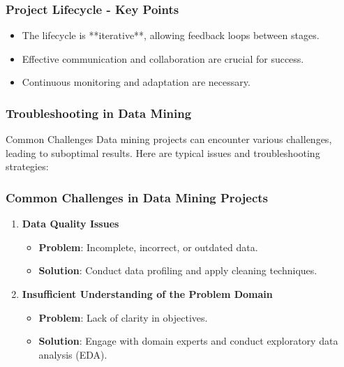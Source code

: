 \documentclass[aspectratio=169]{beamer}
\begin{document}
\begin{frame}[fragile]
    \frametitle{Project Lifecycle - Key Points}
    \begin{itemize}
        \item The lifecycle is **iterative**, allowing feedback loops between stages.
        \item Effective communication and collaboration are crucial for success.
        \item Continuous monitoring and adaptation are necessary.
    \end{itemize}
\end{frame}

\begin{frame}[fragile]
    \frametitle{Troubleshooting in Data Mining}
    \begin{block}{Common Challenges}
        Data mining projects can encounter various challenges, leading to suboptimal results. Here are typical issues and troubleshooting strategies:
    \end{block}
\end{frame}

\begin{frame}[fragile]
    \frametitle{Common Challenges in Data Mining Projects}
    
    \begin{enumerate}
        \item \textbf{Data Quality Issues}
        \begin{itemize}
            \item \textbf{Problem}: Incomplete, incorrect, or outdated data.
            \item \textbf{Solution}: Conduct data profiling and apply cleaning techniques.
        \end{itemize}
        
        \item \textbf{Insufficient Understanding of the Problem Domain}
        \begin{itemize}
            \item \textbf{Problem}: Lack of clarity in objectives.
            \item \textbf{Solution}: Engage with domain experts and conduct exploratory data analysis (EDA).
        \end{itemize}
    \end{enumerate}
\end{frame}
\end{document}
